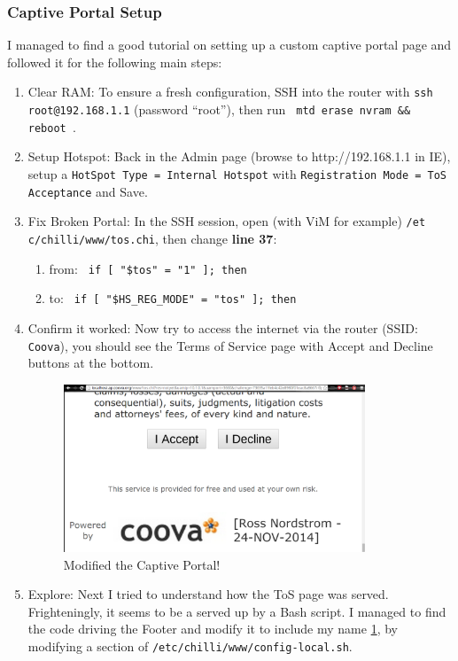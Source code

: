 \subsubsection{Captive Portal Setup}
I managed to find a good tutorial \cite{article:CoovaHotSpotSetup} on setting up a custom captive
portal page and followed it for the following main steps:
\begin{enumerate}
\item{Clear RAM:}  To ensure a fresh configuration, SSH into the router with \texttt{ssh
root@192.168.1.1} (password ``root''), then run \texttt{ mtd erase nvram \&\& reboot }.
\item{Setup Hotspot:}  Back in the Admin page (browse to http://192.168.1.1 in IE), setup a
\texttt{HotSpot Type = Internal Hotspot} with \texttt{Registration Mode = ToS Acceptance} and Save.
\item{Fix Broken Portal:}  In the SSH session, open (with ViM for example)
\texttt{/et c/chilli/www/tos.chi}, then change \textbf{line 37}:
  \begin{enumerate}
  \item{from:} \texttt{ if [ "\$tos" = "1" ]; then }
  \item{to:} \texttt{ if [ "\$HS\_REG\_MODE" = "tos" ]; then}
  \end{enumerate}
\item{Confirm it worked:}  Now try to access the internet via the router (SSID: \texttt{Coova}), you
should see the Terms of Service page with Accept and Decline buttons at the bottom.

\begin{figure}[ht!]
\centering
\includegraphics[width=90mm]{fig/footer.png}
\caption{Modified the Captive Portal!}
\label{fig:footer}
\end{figure}

\item{Explore:}  Next I tried to understand how the ToS page was served. Frighteningly, it seems to
be a served up by a Bash script. I managed to find the code driving the Footer and modify it to
include my name \ref{fig:footer}, by modifying a section of
\texttt{/etc/chilli/www/config-local.sh}.


\end{enumerate}

